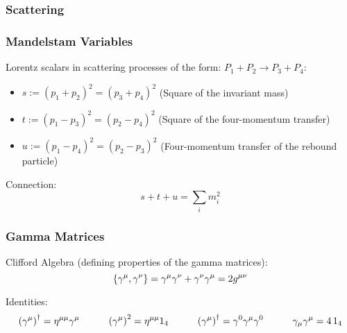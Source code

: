		\subsubsection{Scattering}
			\subsubsection{Mandelstam Variables}
				\noindent
				Lorentz scalars in scattering processes of the form: $P_1 + P_2 \rightarrow P_3 + P_4$:
				\begin{itemize}\itemsep -0pt	%
					\item $s:=(p_1+p_2)^2=(p_3+p_4)^2$ \hfill{(Square of the invariant mass)}
					\item $t:=(p_1-p_3)^2=(p_2-p_4)^2$ \hfill{(Square of the four-momentum transfer)}
					\item $u:=(p_1-p_4)^2=(p_2-p_3)^2$ \hfill{(Four-momentum transfer of the rebound particle)}
				\end{itemize}
	
				\noindent
				Connection:
				\begin{equation}
					s+t+u = \sum_i m_i^2
				\end{equation}

		\subsubsection{Gamma Matrices}
			\noindent
			Clifford Algebra (defining properties of the gamma matrices):
			\begin{equation}
				\acomm{\gamma^\mu}{\gamma^\nu} = \gamma^\mu \gamma^\nu + \gamma^\nu \gamma^\mu = 2g^{\mu\nu}
			\end{equation}

			\noindent
			Identities:
			\begin{equation}
				\qty(\gamma^\mu)^\dagger = \eta^{\mu\mu} \gamma^\mu
				\hspace{30pt} \qty(\gamma^\mu)^2 = \eta^{\mu\mu} 1_4
				\hspace{30pt} \qty(\gamma^\mu)^\dagger = \gamma^0 \gamma^\mu \gamma^0
				\hspace{30pt} \gamma_\mu \gamma^\mu = 4 \,1_4
			\end{equation}

